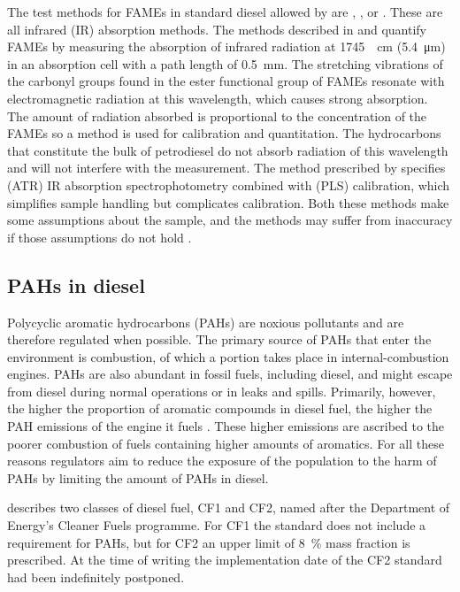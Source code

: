 The test methods for FAMEs in standard diesel allowed by  are
, , or . These are all infrared
(IR) absorption methods. The methods described in  and  quantify FAMEs by measuring the absorption of infrared radiation at
\SI{1745}{\per\centi\metre} (\SI{5.4}{\micro\metre}) in an absorption cell with
a path length of \SI{0.5}{\milli\metre}. The stretching vibrations of the
carbonyl groups found in the ester functional group of FAMEs resonate with
electromagnetic radiation at this wavelength, which causes strong absorption.
The amount of radiation absorbed is proportional to the concentration of the
FAMEs so a  method is used for calibration and quantitation.
The hydrocarbons that constitute the bulk of petrodiesel do not absorb radiation
of this wavelength and will not interfere with the measurement. The method
prescribed by  specifies 
(ATR) IR absorption spectrophotometry combined with  (PLS) calibration, which simplifies sample handling but complicates
calibration. Both these methods make some assumptions about the sample, and the
methods may suffer from inaccuracy if those assumptions do not hold
\autocite{Pinho2014}.

\subsection{PAHs in diesel} 

Polycyclic aromatic hydrocarbons (PAHs) are noxious pollutants and are therefore
regulated when possible. The primary source of PAHs that enter the environment
is combustion, of which a portion takes place in internal-combustion engines.
PAHs are also abundant in fossil fuels, including diesel, and might escape from
diesel during normal operations or in leaks and spills. Primarily, however, the
higher the proportion of aromatic compounds in diesel fuel, the higher the PAH
emissions of the engine it fuels \autocite{Souza2016}. These higher emissions
are ascribed to the poorer combustion of fuels containing higher amounts of
aromatics. For all these reasons regulators aim to reduce the exposure of the
population to the harm of PAHs by limiting the amount of PAHs in diesel.

 describes two classes of diesel fuel, CF1 and CF2, named after the
Department of Energy's Cleaner Fuels programme. For CF1 the standard does not
include a requirement for PAHs, but for CF2 an upper limit of \SI{8}{\percent}
mass fraction is prescribed. At the time of writing the implementation date of
the CF2 standard had been indefinitely postponed. 

